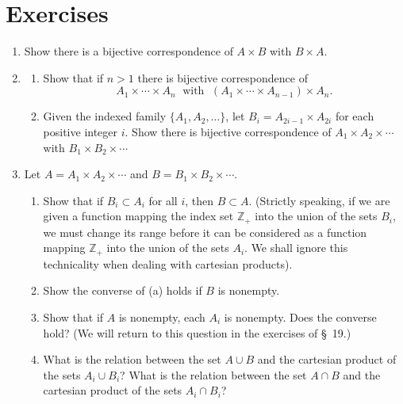 \section*{Exercises}
\begin{enumerate}[itemsep=0.4em, parsep=0pt, topsep=0pt, partopsep=0pt, leftmargin=*, label=\arabic*., ref=\arabic*]
\item Show there is a bijective correspondence of \(A \times B\) with \(B \times A\).
\item
  \begin{enumerate}[itemsep=0.2em, parsep=0pt, topsep=0pt, partopsep=0pt, leftmargin=*, label=(\alph*), align=left]
  \item Show that if \(n > 1\) there is bijective correspondence of \[ A_{1} \times \cdots \times {A}_{n}\;\text{ with }\;({A_{1} \times \cdots \times {A}_{n - 1}}) \times {A}_{n}. \]
  \item Given the indexed family \(\{ {A_{1},A_{2},\ldots }\}\), let \(B_{i} = A_{2i - 1} \times {A}_{2i}\) for each positive integer \(i\). Show there is bijective correspondence of \(A_{1} \times {A}_{2} \times \cdots\) with \(B_{1} \times {B}_{2} \times \cdots\)
  \end{enumerate}
\item Let \(A = A_{1} \times {A}_{2} \times \cdots\) and \(B = B_{1} \times {B}_{2} \times \cdots\).
  \begin{enumerate}[itemsep=0.2em, parsep=0pt, topsep=0pt, partopsep=0pt, leftmargin=*, label=(\alph*), align=left]
  \item Show that if \(B_{i} \subset {A}_{i}\) for all \(i\), then \(B \subset A\). (Strictly speaking, if we are given a function mapping the index set \(\mathbb{Z}_{+}\) into the union of the sets \(B_{i}\), we must change its range before it can be considered as a function mapping \(\mathbb{Z}_{+}\) into the union of the sets \(A_{i}\). We shall ignore this technicality when dealing with cartesian products).
  \item Show the converse of (a) holds if \(B\) is nonempty.
  \item Show that if \(A\) is nonempty, each \(A_{i}\) is nonempty. Does the converse hold? (We will return to this question in the exercises of \S\ 19.)
  \item What is the relation between the set \(A \cup B\) and the cartesian product of the sets \(A_{i} \cup {B}_{i}\)? What is the relation between the set \(A \cap B\) and the cartesian product of the sets \(A_{i} \cap {B}_{i}\)?
  \end{enumerate}

\end{enumerate}
